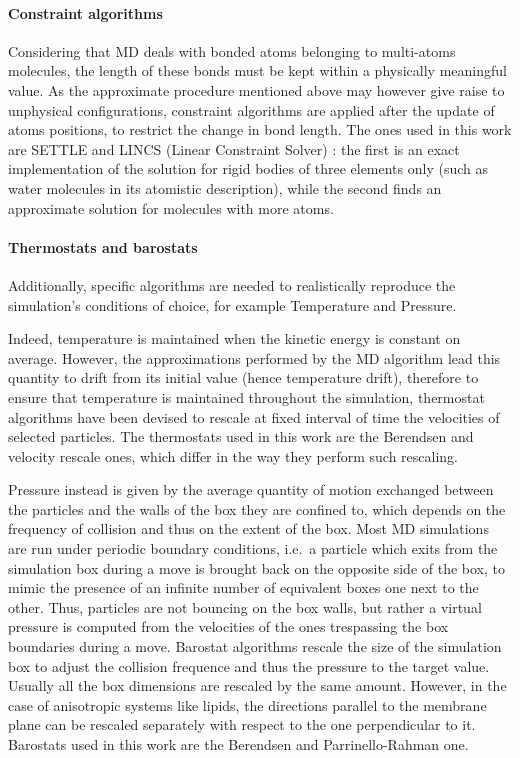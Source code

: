 \paragraph{Constraint algorithms} Considering that MD deals with bonded atoms belonging to multi-atoms molecules, the length of these bonds must be kept within a physically meaningful value. As the approximate procedure mentioned above may however give raise to unphysical configurations, constraint algorithms are applied after the update of atoms positions, to restrict the change in bond length. The ones used in this work are SETTLE \citep{Miyamoto1992} and LINCS (Linear Constraint Solver) \citep{Hess1997}: the first is an exact implementation of the solution for rigid bodies of three elements only (such as water molecules in its atomistic description), while the second finds an approximate solution for molecules with more atoms.

\paragraph{Thermostats and barostats} Additionally, specific algorithms are needed to realistically reproduce the simulation's conditions of choice, for example Temperature and Pressure.

Indeed, temperature is maintained when the kinetic energy is constant on average. However, the approximations performed by the MD algorithm lead this quantity to drift from its initial value (hence temperature drift), therefore to ensure that temperature is maintained throughout the simulation, thermostat algorithms have been devised to rescale at fixed interval of time the velocities of selected particles.
%
The thermostats used in this work are the Berendsen \cite{Berendsen1984} and velocity rescale \cite{Bussi2007} ones, which differ in the way they perform such rescaling.

Pressure instead is given by the average quantity of motion exchanged between the particles and the walls of the box they are confined to, which depends on the frequency of collision and thus on the extent of the box. Most MD simulations are run under periodic boundary conditions, i.e.\ a particle which exits from the simulation box during a move is brought back on the opposite side of the box, to mimic the presence of an infinite number of equivalent boxes one next to the other. Thus, particles are not bouncing on the box walls, but rather a virtual pressure is computed from the velocities of the ones trespassing the box boundaries during a move.
Barostat algorithms rescale the size of the simulation box to adjust the collision frequence and thus the pressure to the target value. Usually all the box dimensions are rescaled by the same amount. However, in the case of anisotropic systems like lipids, the directions parallel to the membrane plane can be rescaled separately with respect to the one perpendicular to it.
%
Barostats used in this work are the Berendsen \cite{Berendsen1984} and Parrinello-Rahman \cite{Parrinello1981} one.

